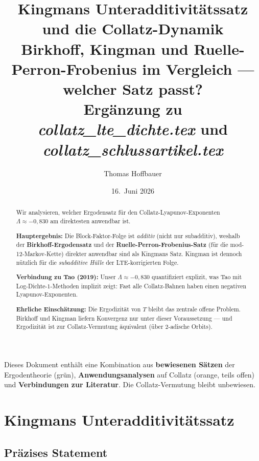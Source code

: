 \documentclass[12pt,a4paper]{article}
\title{%
  Kingmans Unteradditivitätssatz und die Collatz-Dynamik\\[0.3em]
  \large Birkhoff, Kingman und Ruelle-Perron-Frobenius im Vergleich ---
  welcher Satz passt?\\[0.5em]
  \normalsize Ergänzung zu \textit{collatz\_lte\_dichte.tex} und
  \textit{collatz\_schlussartikel.tex}%
}
\author{Thomas Hoffbauer}
\date{16.\ Juni 2026}
\begin{document}
\maketitle

\begin{abstract}
Wir analysieren, welcher Ergodensatz für den Collatz-Lyapunov-Exponenten
$\Lambda \approx -0{,}830$ am direktesten anwendbar ist.

\textbf{Hauptergebnis:} Die Block-Faktor-Folge ist \emph{additiv} (nicht
nur subadditiv), weshalb der \textbf{Birkhoff-Ergodensatz} und der
\textbf{Ruelle-Perron-Frobenius-Satz} (für die mod-12-Markov-Kette)
direkter anwendbar sind als Kingmans Satz. Kingman ist dennoch nützlich
für die \emph{subadditive Hülle} der LTE-korrigierten Folge.

\textbf{Verbindung zu Tao (2019):} Unser $\Lambda \approx -0{,}830$
quantifiziert explizit, was Tao mit Log-Dichte-$1$-Methoden implizit
zeigt: Fast alle Collatz-Bahnen haben einen negativen Lyapunov-Exponenten.

\textbf{Ehrliche Einschätzung:} Die Ergodizität von $T$ bleibt das
zentrale offene Problem. Birkhoff und Kingman liefern Konvergenz nur
unter dieser Voraussetzung --- und Ergodizität ist zur Collatz-Vermutung
äquivalent (über 2-adische Orbits).
\end{abstract}

\tableofcontents

\bigskip
\begin{tcolorbox}[warnung, title={Einordnung dieses Dokuments}]
Dieses Dokument enthält eine Kombination aus \textbf{bewiesenen Sätzen}
der Ergodentheorie (grün), \textbf{Anwendungsanalysen} auf Collatz
(orange, teils offen) und \textbf{Verbindungen zur Literatur}.
Die Collatz-Vermutung bleibt unbewiesen.
\end{tcolorbox}

\section{Kingmans Unteradditivitätssatz}
\label{sec:kingman-satz}

\subsection{Präzises Statement}
\end{document}
